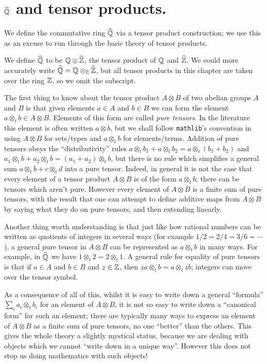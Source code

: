 \section{$\widehat{\mathbb{Q}}$ and tensor products.}

We define the commutative ring $\widehat{\mathbb{Q}}$ via a tensor product construction; we use this as an
excuse to run through the basic theory of tensor products.

We define $\widehat{\mathbb{Q}}$ to be $\mathbb{Q}\otimes\widehat{\mathbb{Z}}$, the tensor product of $\mathbb{Q}$
and $\widehat{\mathbb{Z}}$. We could more accurately write $\widehat{\mathbb{Q}}=\mathbb{Q}\otimes_{\mathbb{Z}}\widehat{\mathbb{Z}}$, but all tensor products
in this chapter are taken over the ring $\mathbb{Z}$, so we omit the subscript.

The first thing to know about the tensor product $A\otimes B$ of two abelian groups $A$ and $B$
is that given elements $a\in A$ and $b\in B$ we can form the element $a\otimes_t b\in A\otimes B$. 
Elements of this form are called \emph{pure tensors}. In the literature this element is often 
written $a\otimes b$, but we shall follow {\tt mathlib}'s convention in using $A \otimes B$ 
for sets/types and $a \otimes_t b$ for elements/terms. Addition of pure tensors obeys 
the ``distributivity'' rules $a\otimes_t b_1+a\otimes_t b_2=a\otimes_t(b_1+b_2)$
and $a_1\otimes_t b+a_2\otimes_t b=(a_1+a_2)\otimes_t b$, but there is no rule which simplifies
a general sum $a\otimes_t b + c\otimes_t d$ into a pure tensor. Indeed, in general it is not the 
case that every element of a tensor product $A\otimes B$ is of the form $a\otimes_t b$; there can be
tensors which aren't pure. However every element of $A\otimes B$ is a finite sum of pure tensors, 
with the result that one can attempt to define additive maps from $A\otimes B$ by saying what they 
do on pure tensors, and then extending linearly.

Another thing worth understanding is that just like how rational numbers can be written as 
quotients of integers in several  ways (for example $1/2=2/4=3/6=\cdots$), a general pure tensor 
in $A\otimes B$ can be represented as $a\otimes_t b$ in many ways. For example, in $\widehat{\mathbb{Q}}$
we have $1\otimes_t 2=2\otimes_t 1$. A general rule for equality of pure tensors is that if 
$a\in A$ and $b\in B$ and $z\in\mathbb{Z}$, then $za\otimes_tb=a\otimes_tzb$; integers can move over the 
tensor symbol. 

As a consequence of all of this, whilst it is easy to write down a general ``formula''
$\sum_ia_i\otimes_t b_i$ for an element of $A\otimes B$, it is not so easy to write down a 
``canonical form'' for such an element; there are typically many ways to express an element
of $A\otimes B$ as a finite sum of pure tensors, no one ``better'' than the others. This gives
the whole theory a slightly mystical status, because we are dealing with objects which
we cannot ``write down in a unique way''. However this does not stop us doing mathematics
with such objects!

